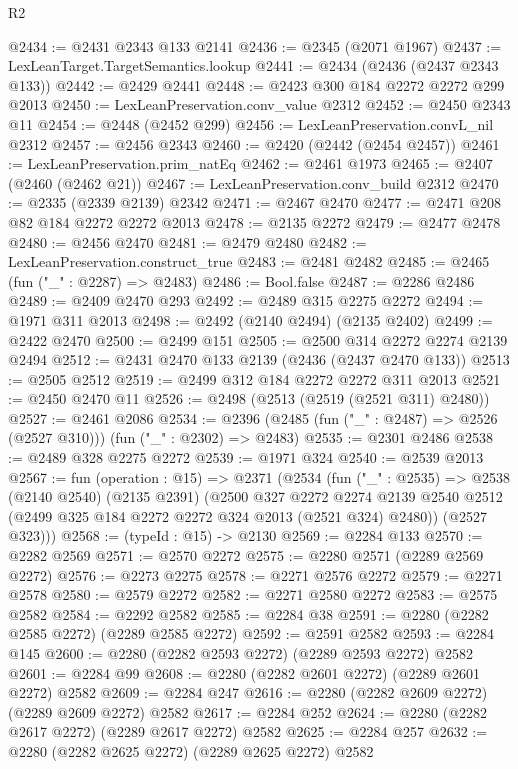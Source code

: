 \begin{lexlean}{R2}
\begin{coremodule}
@2434 := @2431 @2343 @133 @2141
@2436 := @2345 (@2071 @1967)
@2437 := LexLeanTarget.TargetSemantics.lookup
@2441 := @2434 (@2436 (@2437 @2343 @133))
@2442 := @2429 @2441
@2448 := @2423 @300 @184 @2272 @2272 @299 @2013
@2450 := LexLeanPreservation.conv_value @2312
@2452 := @2450 @2343 @11
@2454 := @2448 (@2452 @299)
@2456 := LexLeanPreservation.convL_nil @2312
@2457 := @2456 @2343
@2460 := @2420 (@2442 (@2454 @2457))
@2461 := LexLeanPreservation.prim_natEq
@2462 := @2461 @1973
@2465 := @2407 (@2460 (@2462 @21))
@2467 := LexLeanPreservation.conv_build @2312
@2470 := @2335 (@2339 @2139) @2342
@2471 := @2467 @2470
@2477 := @2471 @208 @82 @184 @2272 @2272 @2013
@2478 := @2135 @2272
@2479 := @2477 @2478
@2480 := @2456 @2470
@2481 := @2479 @2480
@2482 := LexLeanPreservation.construct_true
@2483 := @2481 @2482
@2485 := @2465 (fun ("_" : @2287) => @2483)
@2486 := Bool.false
@2487 := @2286 @2486
@2489 := @2409 @2470 @293
@2492 := @2489 @315 @2275 @2272
@2494 := @1971 @311 @2013
@2498 := @2492 (@2140 @2494) (@2135 @2402)
@2499 := @2422 @2470
@2500 := @2499 @151
@2505 := @2500 @314 @2272 @2274 @2139 @2494
@2512 := @2431 @2470 @133 @2139 (@2436 (@2437 @2470 @133))
@2513 := @2505 @2512
@2519 := @2499 @312 @184 @2272 @2272 @311 @2013
@2521 := @2450 @2470 @11
@2526 := @2498 (@2513 (@2519 (@2521 @311) @2480))
@2527 := @2461 @2086
@2534 := @2396 (@2485 (fun ("_" : @2487) => @2526 (@2527 @310))) (fun ("_" : @2302) => @2483)
@2535 := @2301 @2486
@2538 := @2489 @328 @2275 @2272
@2539 := @1971 @324
@2540 := @2539 @2013
@2567 := fun (operation : @15) =>
  @2371
    (@2534
      (fun ("_" : @2535) =>
      @2538
        (@2140 @2540)
        (@2135 @2391)
        (@2500
          @327
          @2272
          @2274
          @2139
          @2540
          @2512
          (@2499 @325 @184 @2272 @2272 @324 @2013 (@2521 @324) @2480))
        (@2527 @323)))
@2568 := (typeId : @15) -> @2130
@2569 := @2284 @133
@2570 := @2282 @2569
@2571 := @2570 @2272
@2575 := @2280 @2571 (@2289 @2569 @2272)
@2576 := @2273 @2275
@2578 := @2271 @2576 @2272
@2579 := @2271 @2578
@2580 := @2579 @2272
@2582 := @2271 @2580 @2272
@2583 := @2575 @2582
@2584 := @2292 @2582
@2585 := @2284 @38
@2591 := @2280 (@2282 @2585 @2272) (@2289 @2585 @2272)
@2592 := @2591 @2582
@2593 := @2284 @145
@2600 := @2280 (@2282 @2593 @2272) (@2289 @2593 @2272) @2582
@2601 := @2284 @99
@2608 := @2280 (@2282 @2601 @2272) (@2289 @2601 @2272) @2582
@2609 := @2284 @247
@2616 := @2280 (@2282 @2609 @2272) (@2289 @2609 @2272) @2582
@2617 := @2284 @252
@2624 := @2280 (@2282 @2617 @2272) (@2289 @2617 @2272) @2582
@2625 := @2284 @257
@2632 := @2280 (@2282 @2625 @2272) (@2289 @2625 @2272) @2582

\end{coremodule}
\end{lexlean}
